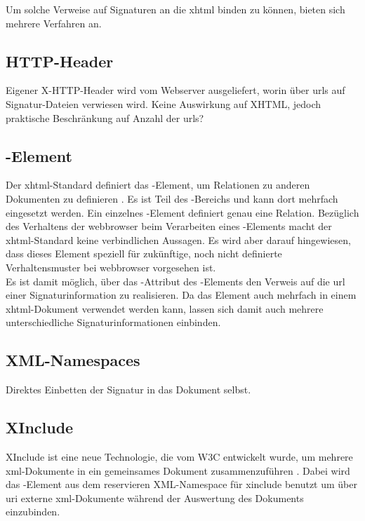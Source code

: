 Um solche Verweise auf Signaturen an die \gls{xhtml} binden zu können, bieten sich mehrere Verfahren an.

\subsection{HTTP-Header}
Eigener X-HTTP-Header wird vom Webserver ausgeliefert, worin über \glspl{url} auf Signatur-Dateien verwiesen wird. Keine Auswirkung auf XHTML, jedoch praktische Beschränkung
auf Anzahl der \glspl{url}?

\subsection{-Element}
Der \gls{xhtml}-Standard definiert das -Element, um Relationen zu anderen Dokumenten zu definieren \cite{xhtml:oreilly}. Es ist Teil des
-Bereichs
und kann dort mehrfach eingesetzt werden. Ein einzelnes -Element definiert genau eine Relation. Bezüglich des Verhaltens der \gls{webbrowser} beim
Verarbeiten eines -Elements macht der \gls{xhtml}-Standard keine verbindlichen Aussagen. Es wird aber darauf hingewiesen, dass dieses Element speziell für
zukünftige, noch nicht definierte Verhaltensmuster bei \gls{webbrowser} vorgesehen ist.\\

Es ist damit möglich, über das -Attribut des -Elements den Verweis auf die \gls{url} einer Signaturinformation zu realisieren. Da das
Element auch mehrfach in einem \gls{xhtml}-Dokument verwendet werden kann, lassen sich damit auch mehrere unterschiedliche Signaturinformationen einbinden.



\subsection{XML-Namespaces}
Direktes Einbetten der Signatur in das Dokument selbst.



\subsection{XInclude}
XInclude ist eine neue Technologie, die vom W3C entwickelt wurde, um mehrere \gls{xml}-Dokumente in ein gemeinsames Dokument zusammenzuführen \cite{xml:oreilly}.
Dabei wird das -Element aus dem reservieren XML-Namespace für \gls{xinclude} benutzt um über \gls{uri} externe \gls{xml}-Dokumente während der
Auswertung des Dokuments einzubinden.


